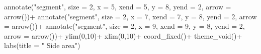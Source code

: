 \documentclass[
  letterpaper,
]{book}
\newenvironment{Shaded}{\begin{snugshade}}{\end{snugshade}}
\newcommand{\AttributeTok}[1]{\textcolor[rgb]{0.40,0.45,0.13}{#1}}
\newcommand{\DecValTok}[1]{\textcolor[rgb]{0.68,0.00,0.00}{#1}}
\newcommand{\FunctionTok}[1]{\textcolor[rgb]{0.28,0.35,0.67}{#1}}
\newcommand{\NormalTok}[1]{\textcolor[rgb]{0.00,0.23,0.31}{#1}}
\newcommand{\SpecialCharTok}[1]{\textcolor[rgb]{0.37,0.37,0.37}{#1}}
\newcommand{\StringTok}[1]{\textcolor[rgb]{0.13,0.47,0.30}{#1}}
\begin{document}
\begin{Shaded}
\begin{Highlighting}[]
  \FunctionTok{annotate}\NormalTok{(}\StringTok{"segment"}\NormalTok{, }\AttributeTok{size =} \DecValTok{2}\NormalTok{, }\AttributeTok{x =} \DecValTok{5}\NormalTok{, }\AttributeTok{xend =} \DecValTok{5}\NormalTok{, }\AttributeTok{y =} \DecValTok{8}\NormalTok{, }\AttributeTok{yend =} \DecValTok{2}\NormalTok{, }\AttributeTok{arrow =} \FunctionTok{arrow}\NormalTok{())}\SpecialCharTok{+}
  \FunctionTok{annotate}\NormalTok{(}\StringTok{"segment"}\NormalTok{, }\AttributeTok{size =} \DecValTok{2}\NormalTok{, }\AttributeTok{x =} \DecValTok{7}\NormalTok{, }\AttributeTok{xend =} \DecValTok{7}\NormalTok{, }\AttributeTok{y =} \DecValTok{8}\NormalTok{, }\AttributeTok{yend =} \DecValTok{2}\NormalTok{, }\AttributeTok{arrow =} \FunctionTok{arrow}\NormalTok{())}\SpecialCharTok{+}
  \FunctionTok{annotate}\NormalTok{(}\StringTok{"segment"}\NormalTok{, }\AttributeTok{size =} \DecValTok{2}\NormalTok{, }\AttributeTok{x =} \DecValTok{9}\NormalTok{, }\AttributeTok{xend =} \DecValTok{9}\NormalTok{, }\AttributeTok{y =} \DecValTok{8}\NormalTok{, }\AttributeTok{yend =} \DecValTok{2}\NormalTok{, }\AttributeTok{arrow =} \FunctionTok{arrow}\NormalTok{())}\SpecialCharTok{+}
  \FunctionTok{ylim}\NormalTok{(}\DecValTok{0}\NormalTok{,}\DecValTok{10}\NormalTok{)}\SpecialCharTok{+}
  \FunctionTok{xlim}\NormalTok{(}\DecValTok{0}\NormalTok{,}\DecValTok{10}\NormalTok{)}\SpecialCharTok{+}
  \FunctionTok{coord\_fixed}\NormalTok{()}\SpecialCharTok{+}
  \FunctionTok{theme\_void}\NormalTok{()}\SpecialCharTok{+}
  \FunctionTok{labs}\NormalTok{(}\AttributeTok{title =} \StringTok{"      Side area"}\NormalTok{)}


\end{Highlighting}
\end{Shaded}
\end{document}
